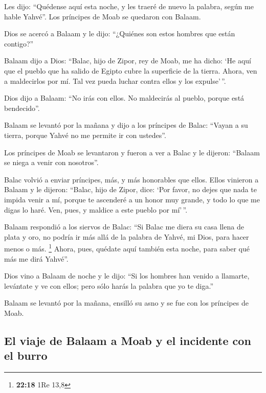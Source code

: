 \begin{paracol}{2}
 Les dijo: ``Quédense aquí esta noche, y les traeré de
nuevo la palabra, según me hable Yahvé''. Los príncipes de Moab se
quedaron con Balaam.

 Dios se acercó a Balaam y le dijo: ``¿Quiénes son estos
hombres que están contigo?''

 Balaam dijo a Dios: ``Balac, hijo de Zipor, rey de Moab,
me ha dicho:  `He aquí que el pueblo que ha salido de
Egipto cubre la superficie de la tierra. Ahora, ven a maldecirlos por
mí. Tal vez pueda luchar contra ellos y los expulse'\,''.

 Dios dijo a Balaam: ``No irás con ellos. No maldecirás
al pueblo, porque está bendecido''.

 Balaam se levantó por la mañana y dijo a los príncipes
de Balac: ``Vayan a su tierra, porque Yahvé no me permite ir con
ustedes''.

 Los príncipes de Moab se levantaron y fueron a ver a
Balac y le dijeron: ``Balaam se niega a venir con nosotros''.

 Balac volvió a enviar príncipes, más, y más honorables
que ellos.  Ellos vinieron a Balaam y le dijeron:
``Balac, hijo de Zipor, dice: `Por favor, no dejes que nada te impida
venir a mí,  porque te ascenderé a un honor muy grande, y
todo lo que me digas lo haré. Ven, pues, y maldice a este pueblo por
mí'\,''.

 Balaam respondió a los siervos de Balac: ``Si Balac me
diera su casa llena de plata y oro, no podría ir más allá de la palabra
de Yahvé, mi Dios, para hacer menos o más. \footnote{\textbf{22:18} 1Re
  13,8}  Ahora, pues, quédate aquí también esta noche,
para saber qué más me dirá Yahvé''.

 Dios vino a Balaam de noche y le dijo: ``Si los hombres
han venido a llamarte, levántate y ve con ellos; pero sólo harás la
palabra que yo te diga.''

 Balaam se levantó por la mañana, ensilló su asno y se
fue con los príncipes de Moab.

\hypertarget{el-viaje-de-balaam-a-moab-y-el-incidente-con-el-burro}{%
\subsection{El viaje de Balaam a Moab y el incidente con el
burro}\label{el-viaje-de-balaam-a-moab-y-el-incidente-con-el-burro}}


\end{paracol}
